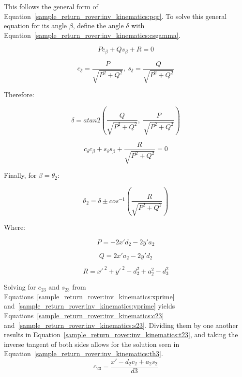 This follows the general form of Equation~\ref{sample_return_rover:inv_kinematics:pqr}. To solve this general equation for its angle $\beta$, define the angle $\delta$ with Equation~\ref{sample_return_rover:inv_kinematics:csgamma}.

\begin{equation}\label{sample_return_rover:inv_kinematics:pqr}
	Pc_{\beta} + Qs_{\beta} + R = 0
\end{equation}

\begin{equation}\label{sample_return_rover:inv_kinematics:csgamma}
	c_{\delta} = \frac{P}{\sqrt{P^{2} + Q^{2}}} ,\:
	s_{\delta} = \frac{Q}{\sqrt{P^{2} + Q^{2}}}
\end{equation}

Therefore:

\begin{equation}\label{sample_return_rover:inv_kinematics:delta}
	\delta = atan2\left(\frac{Q}{\sqrt{P^{2} + Q^{2}}},\; \frac{P}{\sqrt{P^{2} + Q^{2}}}\right)
\end{equation}

\begin{equation}\label{sample_return_rover:inv_kinematics:sum_sines_cosines}
	c_{\delta}c_{\beta} + s_{\delta}s_{\beta} +  \frac{R}{\sqrt{P^{2} + Q^{2}}} = 0
\end{equation}

Finally, for $\beta = \theta_{2}$:

\begin{equation}\label{sample_return_rover:inv_kinematics:beta}
	\theta_{2} = \delta \pm cos^{-1}\left(\frac{-R}{\sqrt{P^{2} + Q^{2}}}\right)
\end{equation}

Where:

\begin{equation}\label{sample_return_rover:inv_kinematics:p}
	P = -2x'd_{2} - 2y'a_{2}
\end{equation}

\begin{equation}\label{sample_return_rover:inv_kinematics:q}
	Q = 2x'a_{2} - 2y'd_{2}
\end{equation}

\begin{equation}\label{sample_return_rover:inv_kinematics:r}
	R = x'^{\;2} + y'^{\;2} + d_{2}^{2} + a_{2}^{2} - d_{3}^{2}
\end{equation}

Solving for $c_{23}$ and $s_{23}$ from Equations~\ref{sample_return_rover:inv_kinematics:xprime} and~\ref{sample_return_rover:inv_kinematics:yprime} yields Equations~\ref{sample_return_rover:inv_kinematics:c23} and~\ref{sample_return_rover:inv_kinematics:s23}. Dividing them by one another results in Equation~\ref{sample_return_rover:inv_kinematics:t23}, and taking the inverse tangent of both sides allows for the solution seen in Equation~\ref{sample_return_rover:inv_kinematics:th3}.
\begin{equation}\label{sample_return_rover:inv_kinematics:c23}
	c_{23} = \frac{x' - d_{2}c_{2} + a_{2}s_{2}}{d3}
\end{equation}

